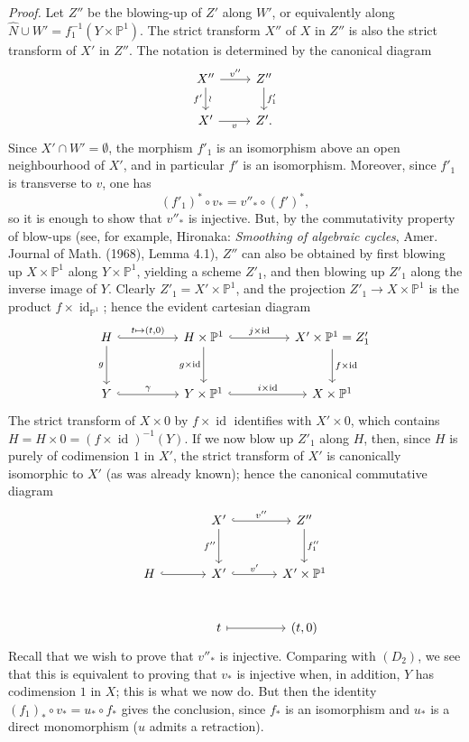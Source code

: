 \emph{Proof.} Let $Z''$ be the blowing-up of $Z'$ along $W'$, or equivalently along $\widehat N\cup W'=f_1^{-1}(Y\times\mathbb P^1)$. The strict transform $X''$ of $X$ in $Z''$ is also the strict transform of $X'$ in $Z''$. The notation is determined by the canonical diagram
\[
\begin{tikzcd}
X''\arrow[r,"v''"]\arrow[d,"f'"',"\wr"]&Z''\arrow[d,"f'_1"]\\
X'\arrow[r,"v"']&Z'.
\end{tikzcd}
\]
Since $X'\cap W'=\emptyset$, the morphism $f'_1$ is an isomorphism above an open neighbourhood of $X'$, and in particular $f'$ is an isomorphism. Moreover, since $f'_1$ is transverse to $v$, one has
\[
(f'_1)^*\circ v_*=v''_*\circ(f')^*,
\tag{9.8.8}
\]
so it is enough to show that $v''_*$ is injective. But, by the commutativity property of blow-ups (see, for example, Hironaka: \emph{Smoothing of algebraic cycles}, Amer. Journal of Math. (1968), Lemma 4.1), $Z''$ can also be obtained by first blowing up $X\times\mathbb P^1$ along $Y\times\mathbb P^1$, yielding a scheme $Z'_1$, and then blowing up $Z'_1$ along the inverse image of $Y$. Clearly $Z'_1=X'\times\mathbb P^1$, and the projection $Z'_1\to X\times\mathbb P^1$ is the product $f\times\operatorname{id}_{\mathbb P^1}$; hence the evident cartesian diagram
\[
\begin{tikzcd}[column sep=huge,row sep=large]
H\arrow[r,hook,"{t\mapsto(t,0)}"]\arrow[d,"g"']&H\times\mathbb P^1\arrow[r,hook,"{j\times\operatorname{id}}"]\arrow[d,"{g\times\operatorname{id}}"']&X'\times\mathbb P^1=Z'_1\arrow[d,"{f\times\operatorname{id}}"]\\
Y\arrow[r,hook,"\gamma"]&Y\times\mathbb P^1\arrow[r,hook,"{i\times\operatorname{id}}"]&X\times\mathbb P^1
\end{tikzcd}
\]
The strict transform of $X\times0$ by $f\times\operatorname{id}$ identifies with $X'\times0$, which contains $H=H\times0=(f\times\operatorname{id})^{-1}(Y)$. If we now blow up $Z'_1$ along $H$, then, since $H$ is purely of codimension $1$ in $X'$, the strict transform of $X'$ is canonically isomorphic to $X'$ (as was already known); hence the canonical commutative diagram
\[
\begin{tikzcd}[column sep=large,row sep=large]
&X'\arrow[r,hook,"v''"]\arrow[d,"f''"']&Z''\arrow[d,"f''_1"]\\
H\arrow[r,hook]&X'\arrow[r,hook,"v'"]&X'\times\mathbb P^1\\
&t\arrow[r,mapsto]&{(t,0)}
\end{tikzcd}
\]
Recall that we wish to prove that $v''_*$ is injective. Comparing with $(D_2)$, we see that this is equivalent to proving that $v_*$ is injective when, in addition, $Y$ has codimension $1$ in $X$; this is what we now do. But then the identity $(f_1)_*\circ v_*=u_*\circ f_*$ gives the conclusion, since $f_*$ is an isomorphism and $u_*$ is a direct monomorphism ($u$ admits a retraction).

